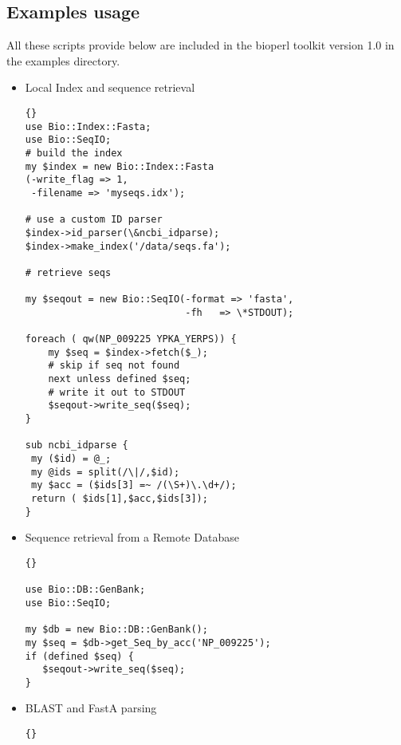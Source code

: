 \documentclass[twocolumn]{article}
\begin{document}
\subsection{Examples usage}

All these scripts provide below are included in the bioperl toolkit
version 1.0 in the examples directory.

\begin{itemize}
\item Local Index and sequence retrieval


\begin{scriptsize}
\begin{lstlisting}{}
use Bio::Index::Fasta;
use Bio::SeqIO;
# build the index
my $index = new Bio::Index::Fasta
(-write_flag => 1,
 -filename => 'myseqs.idx');

# use a custom ID parser
$index->id_parser(\&ncbi_idparse); 
$index->make_index('/data/seqs.fa');

# retrieve seqs

my $seqout = new Bio::SeqIO(-format => 'fasta',
                            -fh   => \*STDOUT);

foreach ( qw(NP_009225 YPKA_YERPS)) {
    my $seq = $index->fetch($_);
    # skip if seq not found
    next unless defined $seq; 
    # write it out to STDOUT
    $seqout->write_seq($seq); 
}

sub ncbi_idparse { 
 my ($id) = @_;
 my @ids = split(/\|/,$id);
 my $acc = ($ids[3] =~ /(\S+)\.\d+/);	
 return ( $ids[1],$acc,$ids[3]);	
}
\end{lstlisting}
\end{scriptsize}

\item Sequence retrieval from a Remote Database
\begin{scriptsize}
\begin{lstlisting}{}

use Bio::DB::GenBank;
use Bio::SeqIO;

my $db = new Bio::DB::GenBank();
my $seq = $db->get_Seq_by_acc('NP_009225');
if (defined $seq) {
   $seqout->write_seq($seq);
}
\end{lstlisting}
\end{scriptsize}

\item BLAST \cite{blast} and FastA \cite{fasta} parsing
\begin{scriptsize}
\begin{lstlisting}{}


\end{lstlisting}
\end{scriptsize}
\end{itemize}
\end{document}
